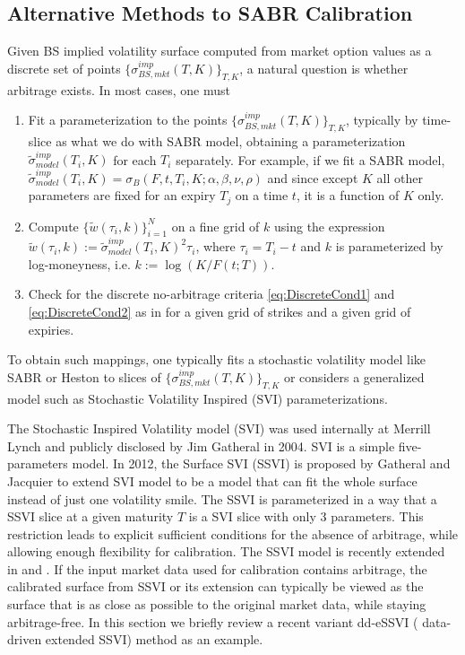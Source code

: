 \documentclass[letterpaper,12pt,titlepage,oneside,final]{book}
\numberwithin{equation}{section}
\theoremstyle{definition}
\begin{document}
\subsection{Alternative Methods to SABR Calibration}
Given BS implied volatility surface computed from market option values as a discrete set of points $\{ \sigma^{imp}_{BS,mkt}(T,K) \}_{T,K}$, a natural question is whether  arbitrage exists. In most cases, one must 
\begin{enumerate}
	\item Fit a parameterization to the points $\{ \sigma^{imp}_{BS,mkt}(T,K) \}_{T,K}$, typically by time-slice as what we do with SABR model, obtaining a parameterization $\widetilde{\sigma}^{imp}_{model}(T_i,K)$ for each $T_i$ separately.
	For example, if we fit a SABR model, $\widetilde{\sigma}^{imp}_{model}(T_i,K)=\sigma_{B}(F,t,T_i,K;\alpha,\beta,\nu,\rho)$ and since except $K$ all other parameters are fixed for an expiry $T_j$ on a time $t$, it is a function of $K$ only.
	\item Compute $\{ \widetilde{w}(\tau_i,k) \}_{i=1}^N$ on a fine grid of $k$ using the expression $\widetilde{w}(\tau_i,k) := \widetilde{\sigma}^{imp}_{model}(T_i,K)^2 \tau_i$,  where $\tau_i =T_i-t$ and $k$ is parameterized by log-moneyness, i.e. $k := \log(K/F(t;T))$.  
	\item Check for the discrete no-arbitrage criteria \eqref{eq:DiscreteCond1} and \eqref{eq:DiscreteCond2} as in \cite{carr2005note} for a given grid of strikes and a given grid of expiries. 
\end{enumerate}
To obtain such mappings, one typically fits a stochastic volatility model like SABR or Heston to slices of $\{\sigma^{imp}_{BS,mkt}(T,K)\}_{T,K}$ or considers a generalized model such as Stochastic Volatility Inspired (SVI) parameterizations.  

The Stochastic Inspired Volatility model (SVI) \cite{gatheral2004parsimonious} was used internally at Merrill Lynch and publicly disclosed by Jim Gatheral in 2004.  SVI is a simple  five-parameters model.  In 2012,  the Surface SVI (SSVI) \cite{gatheral2014arbitrage} is proposed by Gatheral and Jacquier to extend SVI model to be a model that can fit the whole surface instead of just one volatility smile. The SSVI is parameterized in a way that a  SSVI slice at a given maturity $T$ is a SVI slice with only 3 parameters. This restriction leads to  explicit sufficient conditions for the absence of arbitrage, while allowing enough flexibility for calibration. The SSVI model is recently extended in \cite{hendriks2017extended} and \cite{corbetta2019robust}. If the input market data used for calibration contains arbitrage, the calibrated surface from SSVI \cite{gatheral2014arbitrage} or its extension \cite{hendriks2017extended,corbetta2019robust} can typically be viewed as the surface that is as close as possible to the original market data, while staying arbitrage-free. In this section we briefly review a recent variant dd-eSSVI ( data-driven extended SSVI) method \cite{corbetta2019robust} as an example.
\end{document}
